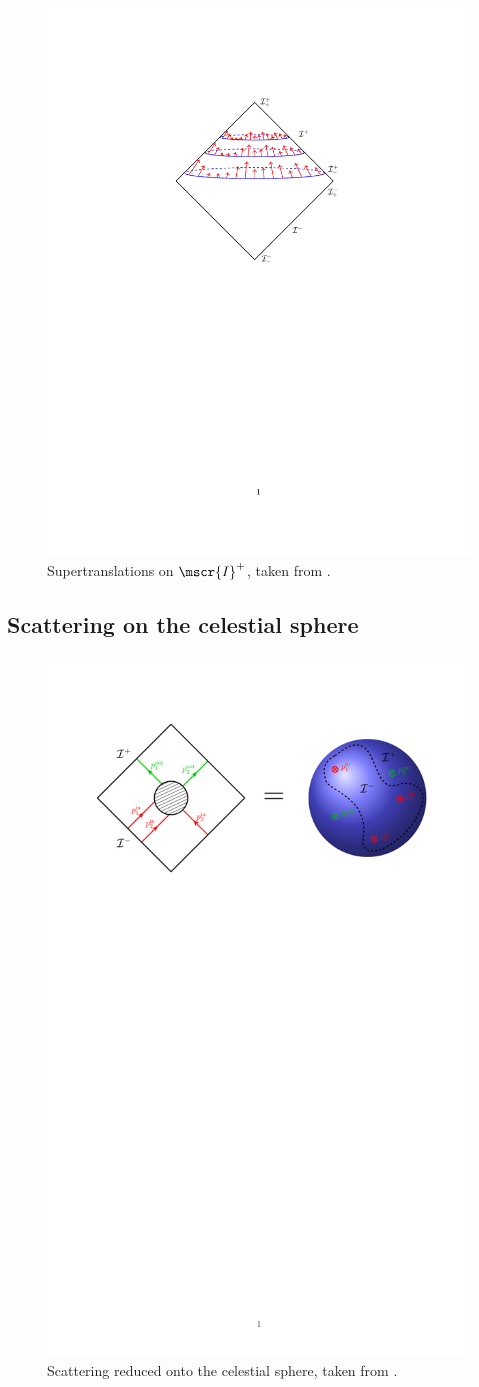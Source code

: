 \documentclass[a4paper
	,10pt
]{article}
\begin{document}
	\begin{figure}[!t]
	\centering
	\includegraphics[width=.45\linewidth]{img/supertranslation.pdf}
	\caption[Supertranslations on $\mscr{I}^+$]{
		Supertranslations on $\mscr{I}^+$, taken from \cite{Strominger:2017zoo}.
	}
	\end{figure}
	
\subsection{Scattering on the celestial sphere}
	
	\begin{figure}[!ht]
	\centering
	\includegraphics[width=.7\linewidth]{img/celestialsphere.pdf}
	\caption[Scattering on the celestial sphere]{
		Scattering reduced onto the celestial sphere, taken from \cite{Strominger:2017zoo}.
	}
	\end{figure}
	
\end{document}
